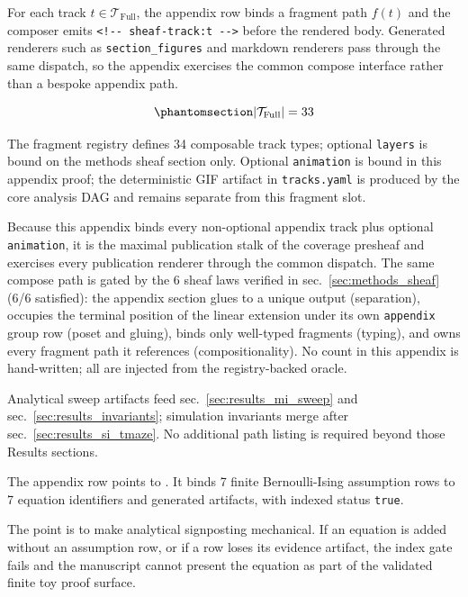 \documentclass[
  english,
]{article}
\begin{document}
For each track \(t \in \mathcal{T}_{\mathrm{Full}}\), the appendix row
binds a fragment path \(f(t)\) and the composer emits
\texttt{\textless{}!-\/-\ sheaf-track:t\ -\/-\textgreater{}} before the
rendered body. Generated renderers such as \texttt{section\_figures} and
markdown renderers pass through the same 
dispatch, so the appendix exercises the common compose interface rather
than a bespoke appendix path.

\begin{equation}\protect\phantomsection\label{eq:appendix_track_count}{
|\mathcal{T}_{\mathrm{Full}}| = 33
}\end{equation}

The fragment registry defines 34 composable track types; optional
\texttt{layers} is bound on the methods sheaf section only. Optional
\texttt{animation} is bound in this appendix proof; the deterministic
GIF artifact in \texttt{tracks.yaml}  is
produced by the core analysis DAG and remains separate from this
fragment slot.

Because this appendix binds every non-optional appendix track plus
optional \texttt{animation}, it is the maximal publication stalk of the
coverage presheaf and exercises every publication renderer through the
common  dispatch. The same compose path
is gated by the 6 sheaf laws verified in sec.~\ref{sec:methods_sheaf}
(6/6 satisfied): the appendix section glues to a unique output
(separation), occupies the terminal position of the linear extension
under its own \texttt{appendix} group row (poset and gluing), binds only
well-typed fragments (typing), and owns every fragment path it
references (compositionality). No count in this appendix is
hand-written; all are injected from the registry-backed oracle.

Analytical sweep artifacts feed sec.~\ref{sec:results_mi_sweep} and
sec.~\ref{sec:results_invariants}; simulation invariants merge after
sec.~\ref{sec:results_si_tmaze}. No additional path listing is required
beyond those Results sections.

The appendix  row points to
. It binds 7
finite Bernoulli-Ising assumption rows to 7 equation identifiers and
generated artifacts, with indexed status \texttt{true}.

The point is to make analytical signposting mechanical. If an equation
is added without an assumption row, or if a row loses its evidence
artifact, the index gate fails and the manuscript cannot present the
equation as part of the validated finite toy proof surface.
\end{document}
